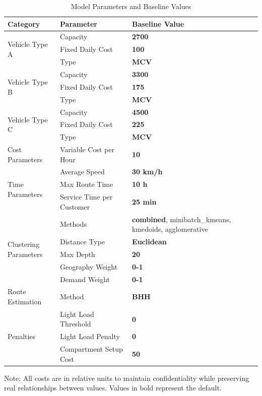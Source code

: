 \begin{table}[H]
\centering
\caption{Model Parameters and Baseline Values}
\begin{tabular}{p{3.5cm}p{5cm}p{3cm}}
\hline
\textbf{Category} & \textbf{Parameter} & \textbf{Baseline Value} \\
\hline
\multirow{3}{*}{Vehicle Type A} & Capacity & \textbf{2700} \\
& Fixed Daily Cost & \textbf{100} \\
& Type & \textbf{MCV} \\
\hline
\multirow{3}{*}{Vehicle Type B} & Capacity & \textbf{3300} \\
& Fixed Daily Cost & \textbf{175} \\
& Type & \textbf{MCV} \\
\hline
\multirow{3}{*}{Vehicle Type C} & Capacity & \textbf{4500} \\
& Fixed Daily Cost & \textbf{225} \\
& Type & \textbf{MCV} \\
\hline
Cost Parameters & Variable Cost per Hour & \textbf{10} \\
\hline
\multirow{3}{*}{Time Parameters} & Average Speed & \textbf{30 km/h} \\
& Max Route Time & \textbf{10 h} \\
& Service Time per Customer & \textbf{25 min} \\
\hline
\multirow{5}{*}{\parbox[c]{3.5cm}{Clustering\\Parameters}} & Methods & \textbf{combined}, minibatch\_kmeans, kmedoids, agglomerative \\
& Distance Type & \textbf{Euclidean} \\
& Max Depth & \textbf{20} \\
& Geography Weight & \textbf{0-1} \\
& Demand Weight & \textbf{0-1} \\
\hline
Route Estimation & Method & \textbf{BHH} \\
\hline
\multirow{3}{*}{Penalties} & Light Load Threshold & \textbf{0} \\
& Light Load Penalty & \textbf{0} \\
& Compartment Setup Cost & \textbf{50} \\
\hline
\end{tabular}
\label{tab:model_parameters}
\begin{flushleft}
\small Note: All costs are in relative units to maintain confidentiality while preserving real relationships between values. Values in bold represent the default.
\end{flushleft}
\end{table}


